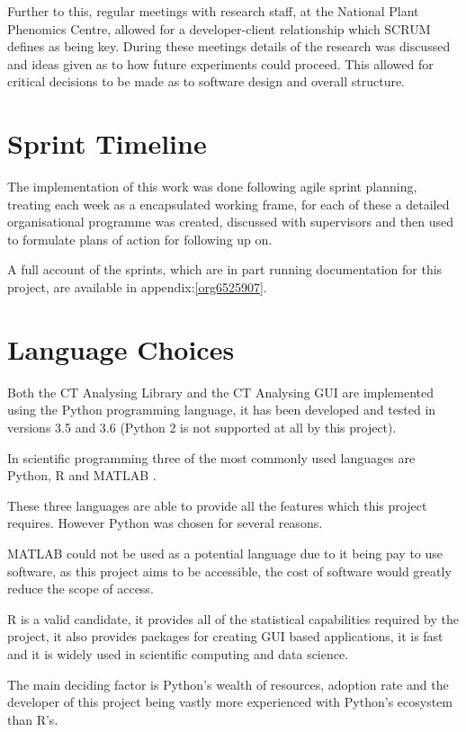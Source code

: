 \documentclass[11pt]{report}
\begin{document}
Further to this, regular meetings with research staff, at the National Plant Phenomics Centre,  allowed for a developer-client relationship which SCRUM defines as being key. During these meetings details of the research was discussed and ideas given as to how future experiments could proceed. This allowed for critical decisions to be made as to software design and overall structure.
\section{Sprint Timeline}
\label{sec:org880c0be}
The implementation of this work was done following agile sprint planning, treating each week as a encapsulated working frame, for each of these a detailed organisational programme was created, discussed with supervisors and then used to formulate plans of action for following up on.

A full account of the sprints, which are in part running documentation for this project, are available in appendix:\ref{org6525907}.

\section{Language Choices}
\label{sec:org4ab1b11}
Both the CT Analysing Library and the CT Analysing GUI are implemented using the Python programming language, it has been developed and tested in versions 3.5 and 3.6 (Python 2 is not supported at all by this project).

In scientific programming three of the most commonly used languages are Python, R and MATLAB \cite{Ozgur2016}.

These three languages are able to provide all the features which this project requires. However Python was chosen for several reasons.

MATLAB could not be used as a potential language due to it being pay to use software, as this project aims to be accessible, the cost of software would greatly reduce the scope of access.

R is a valid candidate, it provides all of the statistical capabilities required by the project, it also provides packages for creating GUI based applications, it is fast and it is widely used in scientific computing and data science.

The main deciding factor is Python's wealth of resources, adoption rate and the developer of this project being vastly more experienced with Python's ecosystem than R's.
\end{document}
